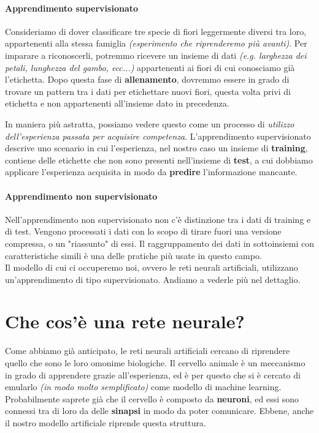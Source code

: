 \documentclass[12pt, twoside, letterpaper]{report}
\begin{document}
				\paragraph{Apprendimento supervisionato} Consideriamo di dover classificare tre specie di fiori leggermente diversi tra loro, appartenenti alla stessa famiglia \textit{(esperimento che riprenderemo più avanti)}. Per imparare a riconoscerli, potremmo ricevere un insieme di dati \textit{(e.g. larghezza dei petali, lunghezza del gambo, ecc...)} appartenenti ai fiori di cui conosciamo già l'etichetta. Dopo questa fase di \textbf{allenamento}, dovremmo essere in grado di trovare un pattern tra i dati per etichettare nuovi fiori, questa volta privi di etichetta e non appartenenti all'insieme dato in precedenza. 
				
					In maniera più astratta, possiamo vedere questo come un processo di \textit{utilizzo dell'esperienza passata per acquisire competenza}. L'apprendimento supervisionato descrive uno scenario in cui l'esperienza, nel nostro caso un insieme di \textbf{training}, contiene delle etichette che non sono presenti nell'insieme di \textbf{test}, a cui dobbiamo applicare l'esperienza acquisita in modo da \textbf{predire} l'informazione mancante.
				
				\paragraph{Apprendimento non supervisionato}  Nell'apprendimento non supervisionato non c'è distinzione tra i dati di training e di test. Vengono processati i dati con lo scopo di tirare fuori una versione compressa, o un "riassunto" di essi. Il raggruppamento dei dati in sottoinsiemi con caratteristiche simili è una delle pratiche più usate in questo campo.\\
				
				Il modello di cui ci occuperemo noi, ovvero le reti neurali artificiali, utilizzano un'apprendimento di tipo supervisionato. Andiamo a vederle più nel dettaglio.
			
		\section{Che cos'è una rete neurale?}
			Come abbiamo già anticipato, le reti neurali artificiali cercano di riprendere quello che sono le loro omonime biologiche. Il cervello animale è un meccanismo in grado di apprendere grazie all'esperienza, ed è per questo che si è cercato di emularlo \textit{(in modo molto semplificato)} come modello di machine learning. Probabilmente saprete già che il cervello è composto da \textbf{neuroni}, ed essi sono connessi tra di loro da delle \textbf{sinapsi} in modo da poter comunicare. Ebbene, anche il nostro modello artificiale riprende questa struttura.
			
\end{document}
